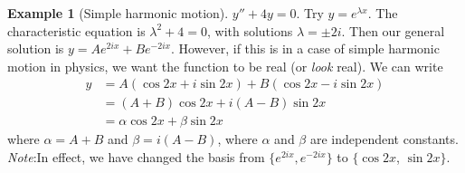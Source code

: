 \documentclass[a4paper]{article}
\theoremstyle{definition}
\newtheorem*{eg}{Example}
\newcommand{\note}{\noindent \emph{Note}:\;}
\begin{document}
\begin{eg}[Simple harmonic motion]
  $y'' + 4y = 0$. Try $y = e^{\lambda x}$. The characteristic equation is $\lambda^2 + 4 = 0$, with solutions $\lambda = \pm 2i$. Then our general solution is $y = Ae^{2ix} + Be^{-2ix}$. However, if this is in a case of simple harmonic motion in physics, we want the function to be real (or \emph{look} real). We can write
  \begin{align*}
    y &= A(\cos 2x + i\sin 2x) + B(\cos 2x - i\sin 2x)\\
    &= (A + B)\cos 2x + i(A - B)\sin 2x\\
    &= \alpha\cos 2x + \beta\sin 2x
  \end{align*}
where $\alpha = A + B$ and $\beta = i(A - B)$, where $\alpha$ and $\beta$ are independent constants.
\note In effect, we have changed the basis from $\{e^{2ix}, e^{-2ix}\}$ to $\{\cos 2x$, $\sin 2x\}$.
\end{eg}
\end{document}
